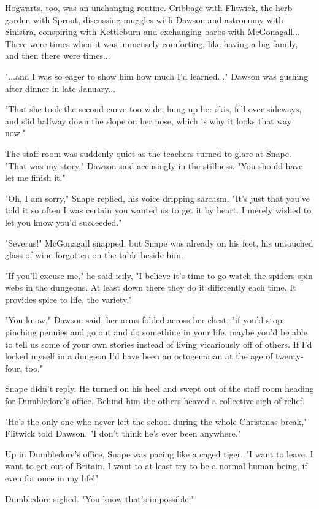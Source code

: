 \documentclass[a4paper,11pt]{article}
\begin{document}
Hogwarts, too, was an unchanging routine. Cribbage with Flitwick, the herb garden with Sprout, discussing muggles with Dawson and astronomy with Sinistra, conspiring with Kettleburn and exchanging barbs with McGonagall... There were times when it was immensely comforting, like having a big family, and then there were times...

"...and I was so eager to show him how much I'd learned..." Dawson was gushing after dinner in late January...

"That she took the second curve too wide, hung up her skis, fell over sideways, and slid halfway down the slope on her nose, which is why it looks that way now."

The staff room was suddenly quiet as the teachers turned to glare at Snape. "That was my story," Dawson said accusingly in the stillness. "You should have let me finish it."

"Oh, I am sorry," Snape replied, his voice dripping sarcasm. "It's just that you've told it so often I was certain you wanted us to get it by heart. I merely wished to let you know you'd succeeded."

"Severus!" McGonagall snapped, but Snape was already on his feet, his untouched glass of wine forgotten on the table beside him.

"If you'll excuse me," he said icily, "I believe it's time to go watch the spiders spin webs in the dungeons. At least down there they do it differently each time. It provides spice to life, the variety."

"You know," Dawson said, her arms folded across her chest, "if you'd stop pinching pennies and go out and do something in your life, maybe you'd be able to tell us some of your own stories instead of living vicariously off of others. If I'd locked myself in a dungeon I'd have been an octogenarian at the age of twenty-four, too."

Snape didn't reply. He turned on his heel and swept out of the staff room heading for Dumbledore's office. Behind him the others heaved a collective sigh of relief.

"He's the only one who never left the school during the whole Christmas break," Flitwick told Dawson. "I don't think he's ever been anywhere."

Up in Dumbledore's office, Snape was pacing like a caged tiger. "I want to leave. I want to get out of Britain. I want to at least try to be a normal human being, if even for once in my life!"

Dumbledore sighed. "You know that's impossible."
\end{document}
